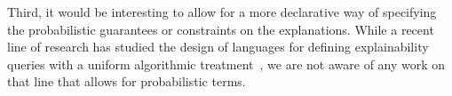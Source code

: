 Third, it would be interesting to allow for a more declarative way of specifying the probabilistic guarantees or constraints on the explanations. While a recent line of research has studied the design of languages for defining explainability queries with a uniform algorithmic treatment~\citep{arenasFoundationsSymbolicLanguages2021,bps2020,KR2024-6}, we are not aware of any work on that line that allows for probabilistic terms.
